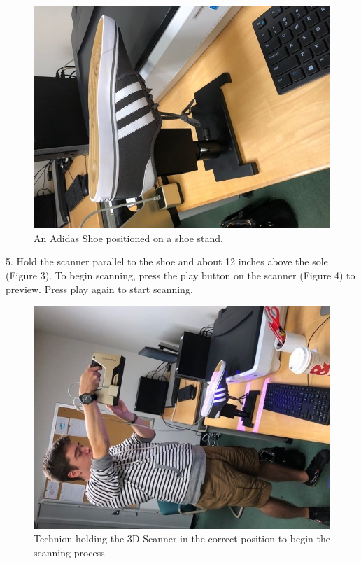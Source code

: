 \begin{figure}[!htp]
\centering
\includegraphics[scale=1, angle=270]{3D_Shoe_on_Stand}
\caption{An Adidas Shoe positioned on a shoe stand.}
\label{Image 2}
\end{figure}

5. Hold the scanner parallel to the shoe and about 12 inches above the sole (Figure 3). To begin scanning, press the play button on the scanner (Figure 4) to preview. Press play again to start scanning.

\begin{figure}[!htp]
\centering
\includegraphics[scale=1, angle=270]{3D_in_use}
\caption{Technion holding the 3D Scanner in the correct position to begin the scanning process}
\label{Image 3}
\end{figure}

